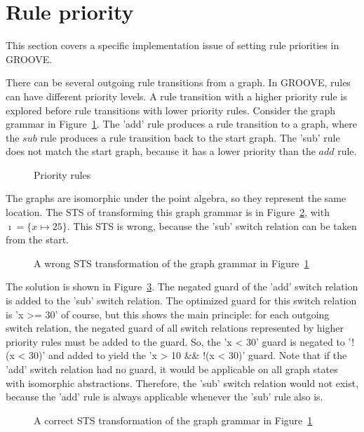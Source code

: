 \section{Rule priority}
This section covers a specific implementation issue of setting rule priorities in GROOVE.

There can be several outgoing rule transitions from a graph. In GROOVE, rules can have different priority levels. A rule transition with a higher priority rule is explored before rule transitions with lower priority rules. Consider the graph grammar in Figure~\ref{fig:priority_gg}. The 'add' rule produces a rule transition to a graph, where the $sub$ rule produces a rule transition back to the start graph. The 'sub' rule does not match the start graph, because it has a lower priority than the $add$ rule.

\begin{figure}[ht]
  \begin{center}
    \hspace{20px}
    \hspace{20px}
  \end{center}
  \caption{Priority rules}
  \label{fig:priority_gg}
\end{figure} 

The graphs are isomorphic under the point algebra, so they represent the same location. The STS of transforming this graph grammar is in Figure~\ref{fig:priority_sts_wrong}, with $\imath = \{x \mapsto 25\}$. This STS is wrong, because the 'sub' switch relation can be taken from the start.

\begin{figure}[ht]
  \begin{center}
    
  \end{center}
  \caption{A wrong STS transformation of the graph grammar in Figure~\ref{fig:priority_gg}}
  \label{fig:priority_sts_wrong}
\end{figure}

The solution is shown in Figure~\ref{fig:priority_sts_right}. The negated guard of the 'add' switch relation is added to the 'sub' switch relation. The optimized guard for this switch relation is 'x >= 30' of course, but this shows the main principle: for each outgoing switch relation, the negated guard of all switch relations represented by higher priority rules must be added to the guard. So, the 'x < 30' guard is negated to '!(x < 30)' and added to yield the 'x > 10 \&\& !(x < 30)' guard. Note that if the 'add' switch relation had no guard, it would be applicable on all graph states with isomorphic abstractions. Therefore, the 'sub' switch relation would not exist, because the 'add' rule is always applicable whenever the 'sub' rule also is.

\begin{figure}[ht]
  \begin{center}
    
  \end{center}
  \caption{A correct STS transformation of the graph grammar in Figure~\ref{fig:priority_gg}}
  \label{fig:priority_sts_right}
\end{figure}
